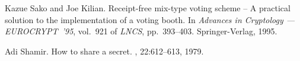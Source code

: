 \documentclass{article}
\begin{document}
\begin{thebibliography}{[CDNO97]}
Kazue Sako and Joe Kilian.
\newblock Receipt-free mix-type voting scheme -- {A} practical solution
  to the implementation of a voting booth.
\newblock In {\em Advances in Cryptology --- {EUROCRYPT}~'95},
  vol.~921 of {\em LNCS}, pp.~393--403.
  {Springer-Verlag}, 1995.

Adi Shamir.
\newblock How to share a secret.
, 22:612--613, 1979.

\end{thebibliography}
\end{document}
